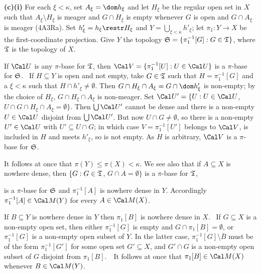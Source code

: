 {\medskip

{\bf (c)(i)} For each $\xi<\kappa$,
set $A_{\xi}=\dom h_{\xi}$ and let $H_{\xi}$ be
the regular open set in $X$ such that $A_{\xi}\setminus H_{\xi}$
is meager and $G\cap H_{\xi}$ is empty whenever $G$ is open and
$G\cap A_{\xi}$
is meager (4A3Ra).   Set $h'_{\xi}=h_{\xi}\restr H_{\xi}$ and
$Y=\bigcup_{\xi<\kappa}h'_{\xi}$;  let
$\pi_1:Y\to X$ be the first-coordinate projection.   Give $Y$ the topology
$\frak S=\{\pi_1^{-1}[G]:G\in\frak T\}$, where $\frak T$ is the topology
of $X$.

\medskip

 If $\Cal U$ is any $\pi$-base for $\frak T$, then
$\Cal V=\{\pi_1^{-1}[U]:U\in\Cal U\}$ is a $\pi$-base for $\frak S$.
\Prf\ If $H\subseteq Y$ is open and not empty, take $G\in\frak T$ such that
$H=\pi_1^{-1}[G]$ and a $\xi<\kappa$ such that $H\cap h'_{\xi}\ne\emptyset$.
Then $G\cap H_{\xi}\cap A_{\xi}=G\cap\dom h'_{\xi}$ is non-empty;
by the choice of
$H_{\xi}$, $G\cap H_{\xi}\cap A_{\xi}$ is non-meager.   Set
$\Cal U'=\{U:U\in\Cal U$, $U\cap G\cap H_{\xi}\cap A_{\xi}=\emptyset\}$.   Then
$\bigcup\Cal U'$ cannot be dense and there is a non-empty $U\in\Cal U$
disjoint from
$\bigcup\Cal U'$.   But now $U\cap G\ne\emptyset$, so there is a non-empty
$U'\in\Cal U$ with $U'\subseteq U\cap G$;  in which case
$V=\pi_1^{-1}[U']$ belongs to
$\Cal V$, is included in $H$ and meets $h'_{\xi}$, so is not empty.
As $H$ is arbitrary, $\Cal V$ is a $\pi$-base for $\frak S$.\ \QeD\

\medskip

It follows at once that $\pi(Y)\le\pi (X)<\kappa$.   We see also that if
$A\subseteq X$ is nowhere dense, then $\{G:G\in\frak T$, $G\cap A=\emptyset\}$ is a
$\pi$-base for $\frak T$,


\noindent is a $\pi$-base for $\frak S$ and $\pi_1^{-1}[A]$ is nowhere dense in $Y$.
Accordingly $\pi_1^{-1}[A]\in\Cal M(Y)$ for every $A\in\Cal M(X)$.

\medskip

If $B\subseteq Y$ is nowhere dense in $Y$ then $\pi_1[B]$ is nowhere dense in $X$.
\Prf\ If $G\subseteq X$ is a non-empty open set, then either $\pi_1^{-1}[G]$ is empty
and $G\cap\pi_1[B]=\emptyset$, or $\pi_1^{-1}[G]$ is a non-empty open subset of $Y$.
In the latter case, $\pi_1^{-1}[G]\setminus\overline{B}$ must be of the form
$\pi_1^{-1}[G']$ for some open set $G'\subseteq X$, and $G'\cap G$ is a non-empty open
subset of $G$ disjoint from $\pi_1[B]$.\ \QeD\
It follows at once that $\pi_1[B]\in\Cal M(X)$ whenever $B\in\Cal M(Y)$.

}
